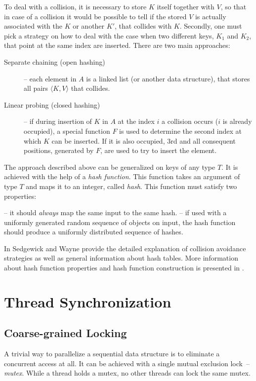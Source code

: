 To deal with a collision, it is necessary to store $K$ itself together with $V$, so that in case of a collision it would be possible to tell if the stored $V$ is actually associated with the $K$ or another $K'$, that collides with $K$. Secondly, one must pick a strategy on how to deal with the case when two different keys, $K_1$ and $K_2$, that point at the same index are inserted. There are two main approaches:
\begin{description}
\item[Separate chaining (open hashing)]-- each element in $A$ is a linked list (or another data structure), that stores all pairs $\langle K, V\rangle$ that collides.
\item[Linear probing (closed hashing)]-- if during insertion of $K$ in $A$ at the index $i$ a collision occurs ($i$ is already occupied), a special function $F$ is used to determine the second index at which $K$ can be inserted. If it is also occupied, 3rd and all consequent positions, generated by $F$, are used to try to insert the element.
\end{description}

The approach described above can be generalized on keys of any type $T$. It is achieved with the help of a \emph{hash function}. This function takes an argument of type $T$ and maps it to an integer, called \emph{hash}. This function must satisfy two properties:

\begin{block-description}
\blockitem[Determinism]-- it should \emph{always} map the same input to the same hash.
\blockitem[Uniformity]-- if used with a uniformly generated random sequence of objects on input, the hash function should produce a uniformly distributed sequence of hashes.
\end{block-description}

In \cite[p.~464]{sedgewick} Sedgewick and Wayne provide the detailed explanation of collision avoidance strategies as well as general information about hash tables. More information about hash function properties and hash function construction is presented in \cite{knott}.

\section{Thread Synchronization}



\subsection{Coarse-grained Locking}
\label{sec:cgl}
A trivial way to parallelize a sequential data structure is to eliminate a concurrent access at all. It can be achieved with a single mutual exclusion lock~-- \emph{mutex}.
While a thread holds a mutex, no other threads can lock the same mutex.

